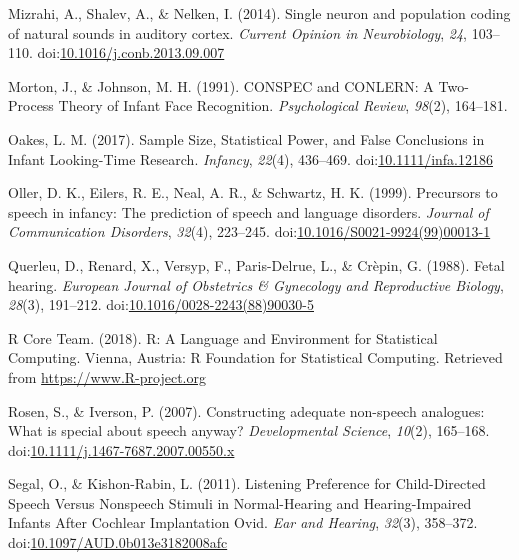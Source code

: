 \documentclass[man]{apa6}
\begin{document}
\hypertarget{ref-mizrahi_single_2014}{}
Mizrahi, A., Shalev, A., \& Nelken, I. (2014). Single neuron and
population coding of natural sounds in auditory cortex. \emph{Current
Opinion in Neurobiology}, \emph{24}, 103--110.
doi:\href{https://doi.org/10.1016/j.conb.2013.09.007}{10.1016/j.conb.2013.09.007}

\hypertarget{ref-morton_conspec_1991}{}
Morton, J., \& Johnson, M. H. (1991). CONSPEC and CONLERN: A Two-Process
Theory of Infant Face Recognition. \emph{Psychological Review},
\emph{98}(2), 164--181.

\hypertarget{ref-oakes_sample_2017}{}
Oakes, L. M. (2017). Sample Size, Statistical Power, and False
Conclusions in Infant Looking-Time Research. \emph{Infancy},
\emph{22}(4), 436--469.
doi:\href{https://doi.org/10.1111/infa.12186}{10.1111/infa.12186}

\hypertarget{ref-oller_precursors_1999}{}
Oller, D. K., Eilers, R. E., Neal, A. R., \& Schwartz, H. K. (1999).
Precursors to speech in infancy: The prediction of speech and language
disorders. \emph{Journal of Communication Disorders}, \emph{32}(4),
223--245.
doi:\href{https://doi.org/10.1016/S0021-9924(99)00013-1}{10.1016/S0021-9924(99)00013-1}

\hypertarget{ref-querleu_fetal_1988}{}
Querleu, D., Renard, X., Versyp, F., Paris-Delrue, L., \& Crèpin, G.
(1988). Fetal hearing. \emph{European Journal of Obstetrics \&
Gynecology and Reproductive Biology}, \emph{28}(3), 191--212.
doi:\href{https://doi.org/10.1016/0028-2243(88)90030-5}{10.1016/0028-2243(88)90030-5}

\hypertarget{ref-r_core_team_r:_2018}{}
R Core Team. (2018). R: A Language and Environment for Statistical
Computing. Vienna, Austria: R Foundation for Statistical Computing.
Retrieved from \url{https://www.R-project.org}

\hypertarget{ref-rosen_constructing_2007}{}
Rosen, S., \& Iverson, P. (2007). Constructing adequate non-speech
analogues: What is special about speech anyway? \emph{Developmental
Science}, \emph{10}(2), 165--168.
doi:\href{https://doi.org/10.1111/j.1467-7687.2007.00550.x}{10.1111/j.1467-7687.2007.00550.x}

\hypertarget{ref-segal_listening_2011}{}
Segal, O., \& Kishon-Rabin, L. (2011). Listening Preference for
Child-Directed Speech Versus Nonspeech Stimuli in Normal-Hearing and
Hearing-Impaired Infants After Cochlear Implantation Ovid. \emph{Ear and
Hearing}, \emph{32}(3), 358--372.
doi:\href{https://doi.org/10.1097/AUD.0b013e3182008afc}{10.1097/AUD.0b013e3182008afc}
\end{document}

